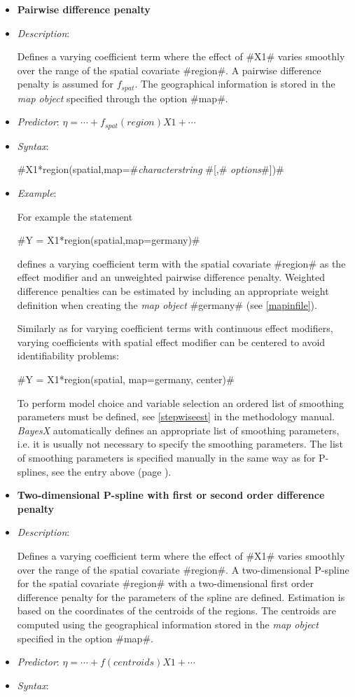 \begin{itemize}
\item[]{\bf\sffamily Pairwise difference penalty}

\item[] {\em Description}:

Defines a varying coefficient term where the effect of #X1# varies
smoothly over the range of the spatial covariate #region#. A
pairwise difference penalty is assumed for $f_{spat}$. The geographical
information is stored in the {\em map object} specified through the
option #map#.
\item[] {\em Predictor}: $\eta = \cdots + f_{spat}(region)X1 + \cdots$
\item[] {\em Syntax}:

#X1*region(spatial,map=#{\it characterstring} #[,# {\it options}#])#
\item[] {\em Example}:

For example the statement

#Y = X1*region(spatial,map=germany)#

defines a varying coefficient term with the spatial covariate
#region# as the effect modifier and an unweighted pairwise difference penalty.
Weighted difference penalties  can be estimated by
including an appropriate weight definition when creating the {\em
map object} #germany# (see \autoref{mapinfile}).

Similarly as for varying coefficient terms with continuous effect
modifiers, varying coefficients with spatial effect modifier can be
centered to avoid identifiability problems:

#Y = X1*region(spatial, map=germany, center)#


To perform model choice and variable selection an ordered list of smoothing parameters must be defined, see
\autoref{stepwiseest} in the methodology manual. {\em BayesX} automatically defines an appropriate list of smoothing
parameters, i.e. it is usually not necessary to  specify the smoothing parameters. The list of smoothing parameters is
specified manually in the same way as for P-splines, see the entry above (page \pageref{psplines_stepwise}).

\clearpage

\item[]{\bf\sffamily Two-dimensional P-spline with first or second order difference penalty}

\item[] {\em Description}:

Defines a varying coefficient term where the effect of #X1# varies
smoothly over the range of the spatial covariate #region#.
A two-dimensional P-spline for the spatial covariate
#region# with a two-dimensional first order difference penalty
for the parameters of the spline are defined. Estimation is based on the
coordinates of the centroids of the regions. The centroids are
computed using the geographical information stored in the {\em map
object} specified in the option #map#.
\item[] {\em Predictor}:
$\eta= \cdots + f(centroids) X1 + \cdots$ \item[] {\em Syntax}:


\end{itemize}
